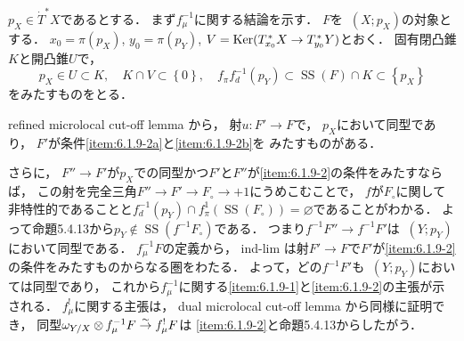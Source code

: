 \documentclass[leqno, 10pt, a4paper, dvipdfmx]{jsarticle}
\makeatletter
\theoremstyle{definition}
\newcommand{\Ker}{\mathop{\mathrm{Ker}}\nolimits} %
\renewenvironment{proof}[1][\proofname]{\par
  \pushQED{\qed}%
  \normalfont \topsep6\p@\@plus6\p@\relax
  \trivlist
  \item[\hskip\labelsep
         \bfseries
    {#1}]\ignorespaces
}{%
  \popQED\endtrivlist\@endpefalse
}
\renewcommand{\proofname}{証明.}
\numberwithin{equation}{section}
\newcommand{\Dompb}{\mathop{\mathsf{D}^\mathrm{b}}\nolimits}
\newcommand{\muS}{\mathop{\mathrm{SS}}\nolimits}
\newcommand{\simar}{\mathrel{\overset{\sim}{\rightarrow}}}%
\newcommand{\tens}[1][]{\mathbin{\otimes_{\raise1.5ex\hbox to-.1em{}{#1}}}}
\theoremstyle{mystyle}
\newcommand{\mpb}[1][]{{#1}_{\pi}} %
\newcommand{\mdiff}[1][]{{#1}_{d}} %
\newcommand{\muinv}[1][]{{#1}_{\mu}^{-1}} %
\newcommand{\muexinv}[1][]{{#1}_{\mu}^{!}} %
\newcommand{\conm}[2][]{T_{#1}^{\hspace{0.7pt}\ast}{#2}}
\newcommand{\cotn}[1][]{\dot{T}^{\ast}{#1}}
\makeatother
\begin{document}
\begin{proof}
    \(p_X\in\cotn[X]\)であるとする．
    まず\(\muinv[f]\)に関する結論を示す．
    \(F\)を\(\Dompb(X;p_X)\)の対象とする．
    \(x_0=\pi(p_X)\), \(y_0=\pi(p_Y)\), \(V=\Ker(\conm[{x_0}]{X}\to\conm[{y_0}]{Y})\)とおく．
    固有閉凸錐\(K\)と開凸錐\(U\)で，\[
        p_X\in U\subset K,\quad
        K\cap V\subset\left\{0\right\},\quad
        \mpb[f]\mdiff[f]^{-1}(p_Y)\subset\muS(F)\cap K \subset\left\{p_X\right\}
    \]をみたすものをとる．

    refined microlocal cut-off lemma から，
    射\(u\colon F'\to F\)で，
    \(p_X\)において同型であり，
    \(F'\)が条件\eqref{item:6.1.9-2a}と\eqref{item:6.1.9-2b}を
    みたすものがある．

    さらに，
    \(F''\to F'\)が\(p_X\)での同型かつ\(F'\)と\(F''\)が\eqref{item:6.1.9-2}の条件をみたすならば，
    この射を完全三角\(F''\to F'\to F_\circ\to +1\)にうめこむことで，
    \(f\)が\(F_\circ\)に関して非特性的であることと\(\mdiff[f]^{-1}(p_Y)\cap \mpb[f]^1(\muS(F_\circ))=\varnothing\)であることがわかる．
    よって命題5.4.13から\(p_Y\notin \muS(f^{-1}F_\circ)\)である．
    つまり\(f^{-1}F''\to f^{-1}F'\)は\(\Dompb(Y;p_Y)\)において同型である．
    \(\muinv[f]F\)の定義から，
    ind-lim は射\(F'\to F\)で\(F'\)が\eqref{item:6.1.9-2}の条件をみたすものからなる圏をわたる．
    よって，どの\(f^{-1}F'\)も\(\Dompb(Y;p_Y)\)においては同型であり，
    これから\(\muinv[f]\)に関する\eqref{item:6.1.9-1}と\eqref{item:6.1.9-2}の主張が示される．
    \(\muexinv[f]\)に関する主張は，
    dual microlocal cut-off lemma から同様に証明でき，
    同型\(\omega_{Y/X}\tens[]\muinv[f]F\simar \muexinv[f]F\)は
    \eqref{item:6.1.9-2}と命題5.4.13からしたがう．
\end{proof}
\end{document}
